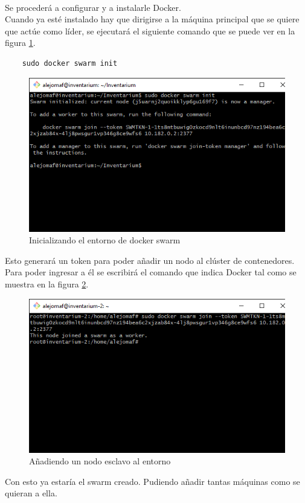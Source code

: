 \\Se procederá a configurar y a instalarle Docker.
\\Cuando ya esté instalado hay que dirigirse a la máquina principal que se quiere que actúe como líder, se ejecutará el siguiente comando que se puede ver en la figura \ref{fig:docker-swarm-init}.
\begin{verbatim}
    sudo docker swarm init
\end{verbatim}
\begin{figure}
    \centering
    \includegraphics[scale=0.5, keepaspectratio]{imagenes/complemento/docker-swarm/docker-swarm-init.png}
    \caption{Inicializando el entorno de docker swarm}\label{fig:docker-swarm-init}
\end{figure}
Esto generará un token para poder añadir un nodo al clúster de contenedores. Para poder ingresar a él se escribirá el comando que indica Docker tal como se muestra en la figura \ref{fig:docker-compose-join}.
\begin{figure}
    \centering
    \includegraphics[scale=0.5, keepaspectratio]{imagenes/complemento/docker-swarm/docker-compose-join.png}
    \caption{Añadiendo un nodo esclavo al entorno}\label{fig:docker-compose-join}
\end{figure}
Con esto ya estaría el swarm creado. Pudiendo añadir tantas máquinas como se quieran a ella.

